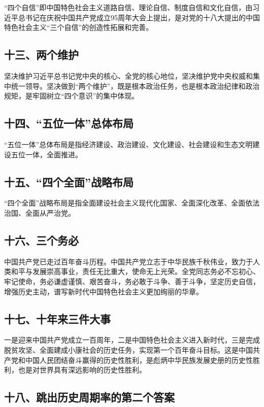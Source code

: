 \documentclass[UTF8,11pt,a4paper]{ctexart}
\begin{document}
“四个自信”即中国特色社会主义道路自信、理论自信、制度自信和文化自信，由习近平总书记在庆祝中国共产党成立95周年大会上提出，是对党的十八大提出的中国特色社会主义“三个自信”的创造性拓展和完善。

\subsection*{十三、两个维护}

坚决维护习近平总书记党中央的核心、全党的核心地位，坚决维护党中央权威和集中统一领导。坚决做到“两个维护”，既是根本政治任务，也是根本政治纪律和政治规矩，是牢固树立“四个意识”的集中体现。

\subsection*{十四、“五位一体”总体布局}

“五位一体”总体布局是指经济建设、政治建设、文化建设、社会建设和生态文明建设五位一体，全面推进。

\subsection*{十五、“四个全面”战略布局}

“四个全面”战略布局是指全面建设社会主义现代化国家、全面深化改革、全面依法治国、全面从严治党。

\subsection*{十六、三个务必}

中国共产党已走过百年奋斗历程。中国共产党立志于中华民族千秋伟业，致力于人类和平与发展崇高事业，责任无比重大，使命无上光荣。全党同志务必不忘初心、牢记使命，务必谦虚谨慎、艰苦奋斗，务必敢于斗争、善于斗争，坚定历史自信，增强历史主动，谱写新时代中国特色社会主义更加绚丽的华章。

\subsection*{十七、十年来三件大事}

一是迎来中国共产党成立一百周年，二是中国特色社会主义进入新时代，三是完成脱贫攻坚、全面建成小康社会的历史任务，实现第一个百年奋斗目标。这是中国共产党和中国人民团结奋斗赢得的历史性胜利，是彪炳中华民族发展史册的历史性胜利，也是对世界具有深远影响的历史性胜利。

\subsection*{十八、跳出历史周期率的第二个答案}
\end{document}

